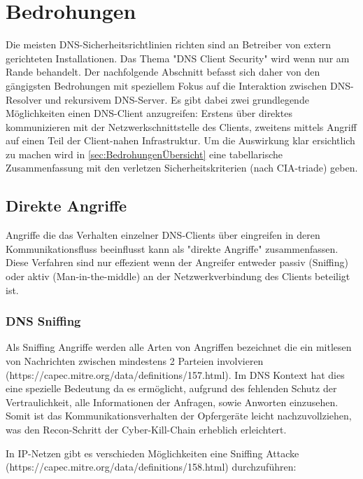 \chapter{Bedrohungen}

Die meisten DNS-Sicherheitsrichtlinien richten sind an Betreiber von extern gerichteten Installationen. Das Thema "DNS Client Security" wird wenn nur am Rande behandelt. Der nachfolgende Abschnitt befasst sich daher von den gängigsten Bedrohungen mit speziellem Fokus auf die Interaktion zwischen DNS-Resolver und rekursivem DNS-Server. 
Es gibt dabei zwei grundlegende Möglichkeiten einen DNS-Client anzugreifen: Erstens über direktes kommunizieren mit der Netzwerkschnittstelle des Clients, zweitens mittels Angriff auf einen Teil der Client-nahen Infrastruktur. Um die Auswirkung klar ersichtlich zu machen wird in \ref{sec:BedrohungenÜbersicht} eine tabellarische Zusammenfassung mit den verletzen Sicherheitskriterien (nach CIA-triade) geben. 

\section{Direkte Angriffe}

Angriffe die das Verhalten einzelner DNS-Clients über eingreifen in deren Kommunikationsfluss beeinflusst kann als "direkte Angriffe" zusammenfassen. Diese Verfahren sind nur effezient wenn der Angreifer entweder passiv (Sniffing) oder aktiv (Man-in-the-middle) an der Netzwerkverbindung des Clients beteiligt ist. 

\subsection{DNS Sniffing}

Als Sniffing Angriffe werden alle Arten von Angriffen bezeichnet die ein mitlesen von Nachrichten zwischen mindestens 2 Parteien involvieren (https://capec.mitre.org/data/definitions/157.html). Im DNS Kontext hat dies eine spezielle Bedeutung da es ermöglicht, aufgrund des fehlenden Schutz der Vertraulichkeit, alle Informationen der Anfragen, sowie Anworten einzusehen. Somit ist das Kommunikationsverhalten der Opfergeräte leicht nachzuvollziehen, was den Recon-Schritt der Cyber-Kill-Chain erheblich erleichtert. 

In IP-Netzen gibt es verschieden Möglichkeiten eine Sniffing Attacke (https://capec.mitre.org/data/definitions/158.html) durchzuführen: 

